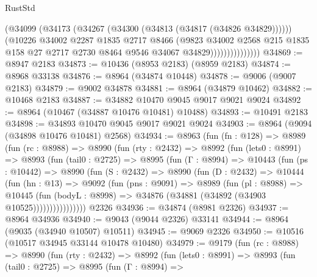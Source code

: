 \begin{lexlean}{RustStd}
\begin{coremodule}
                            (@34099
                              (@34173 (@34267 (@34300 (@34813 (@34817 (@34826 @34829))))))
                              (@10226
                                @34002
                                @2287
                                @1835
                                @2717
                                @8466
                                (@9823
                                  @34002
                                  @2568
                                  @215
                                  @1835
                                  @158
                                  @27
                                  @2717
                                  @2730
                                  @8464
                                  @9546
                                  @34067
                                  @34829)))))))))))))))
@34869 := @8947 @2183
@34873 := @10436 (@8953 @2183) (@8959 @2183)
@34874 := @8968 @33138
@34876 := @8964 (@34874 @10448)
@34878 := @9006 (@9007 @2183)
@34879 := @9002 @34878
@34881 := @8964 (@34879 @10462)
@34882 := @10468 @2183
@34887 := @34882 @10470 @9045 @9017 @9021 @9024
@34892 := @8964 (@10467 (@34887 @10476 @10481) @10488)
@34893 := @10491 @2183
@34898 := @34893 @10470 @9045 @9017 @9021 @9024
@34903 := @8964 (@9094 (@34898 @10476 @10481) @2568)
@34934 := @8963
    (fun (fn : @128) =>
    @8989
      (fun (rc : @8988) =>
      @8990
        (fun (rty : @2432) =>
        @8992
          (fun (lets0 : @8991) =>
          @8993
            (fun (tail0 : @2725) =>
            @8995
              (fun (Γ : @8994) =>
              @10443
                (fun (ps : @10442) =>
                @8990
                  (fun (S : @2432) =>
                  @8990
                    (fun (D : @2432) =>
                    @10444
                      (fun (hn : @13) =>
                      @9092
                        (fun (pns : @9091) =>
                        @8989
                          (fun (pl : @8988) =>
                          @10445
                            (fun (bodyL : @8998) =>
                            @34876 (@34881 (@34892 (@34903 @10525))))))))))))))))
    @2326
@34936 := @34874 (@8981 @2326)
@34937 := @8964 @34936
@34940 := @9043 (@9044 @2326) @33141
@34944 := @8964 (@9035 (@34940 @10507) @10511)
@34945 := @9069 @2326
@34950 := @10516 (@10517 @34945 @33144 @10478 @10480)
@34979 := @9179
    (fun (rc : @8988) =>
    @8990
      (fun (rty : @2432) =>
      @8992
        (fun (lets0 : @8991) =>
        @8993
          (fun (tail0 : @2725) =>
          @8995
            (fun (Γ : @8994) =>

\end{coremodule}
\end{lexlean}
